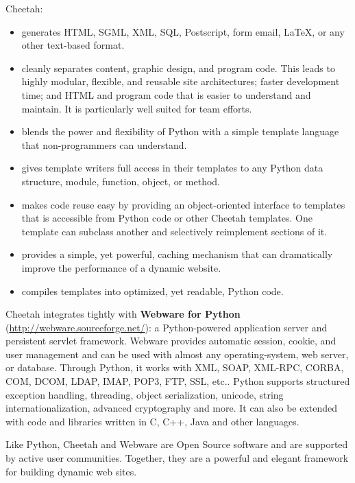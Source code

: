 Cheetah:
\begin{itemize}        
\item generates HTML, SGML, XML, SQL, Postscript, form email, LaTeX, or any
     other text-based format.
     
\item cleanly separates content, graphic design, and program code.  This leads
     to highly modular, flexible, and reusable site architectures; faster
     development time; and HTML and program code that is easier to understand
     and maintain. It is particularly well suited for team efforts.
     
\item blends the power and flexibility of Python with a simple template language
     that non-programmers can understand.
     
\item gives template writers full access in their templates to any Python data
     structure, module, function, object, or method.
     
\item makes code reuse easy by providing an object-oriented interface to
     templates that is accessible from Python code or other Cheetah templates.
     One template can subclass another and selectively reimplement sections of
     it.
     
\item provides a simple, yet powerful, caching mechanism that can dramatically
     improve the performance of a dynamic website.
     
\item compiles templates into optimized, yet readable, Python code.
\end{itemize}   

Cheetah integrates tightly with {\bf Webware for Python}
(\url{http://webware.sourceforge.net/}): a Python-powered application server and
persistent servlet framework. Webware provides automatic session, cookie, and
user management and can be used with almost any operating-system, web server, or
database. Through Python, it works with XML, SOAP, XML-RPC, CORBA, COM, DCOM,
LDAP, IMAP, POP3, FTP, SSL, etc.. Python supports structured exception handling,
threading, object serialization, unicode, string internationalization, advanced
cryptography and more. It can also be extended with code and libraries written
in C, C++, Java and other languages.

Like Python, Cheetah and Webware are Open Source software and are supported by
active user communities.  Together, they are a powerful and elegant framework
for building dynamic web sites. 

